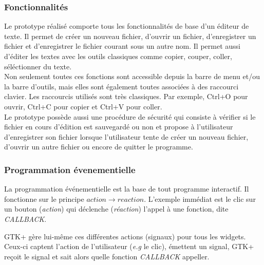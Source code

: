 \subsubsection*{Fonctionnalités}
Le prototype réalisé comporte tous les fonctionnalités de base d'un
éditeur de texte. Il permet de créer un nouveau fichier, d'ouvrir un
fichier, d'enregistrer un fichier et d'enregistrer le fichier courant
sous un autre nom. Il permet aussi d'éditer les textes avec les outils
classiques comme copier, couper, coller, séléctionner du texte.
\\ Non seulement toutes ces fonctions sont accessible depuis la barre
de menu et/ou la barre d'outils, mais elles sont également toutes associées
à des raccourci clavier. Les raccourcis utilisés sont très
classiques. Par exemple, Ctrl+O pour ouvrir, Ctrl+C pour copier et
Ctrl+V pour coller.
\\ Le prototype possède aussi une procédure de
sécurité qui consiste à vérifier si le fichier en cours d'édition est
sauvegardé ou non et propose à l'utilisateur d'enregistrer son
fichier lorsque l'utilisateur tente de créer un nouveau fichier,
d'ouvrir un autre fichier ou encore de quitter le programme.


\subsubsection*{Programmation évenementielle}

La programmation événementielle est la base de tout programme interactif.
Il fonctionne sur le principe $action \rightarrow reaction$. L'exemple 
immédiat est le clic sur un bouton (\textit{action}) qui déclenche (\textit{réaction}) 
l'appel à une fonction, dite \textit{CALLBACK}.

GTK+ gère lui-même ces différentes actions (signaux) pour tous les widgets.
Ceux-ci captent l'action de l'utilisateur (\textit{e.g} le clic), émettent 
un signal, GTK+ reçoit le signal et sait alors quelle fonction \textit{CALLBACK} 
appeller.

